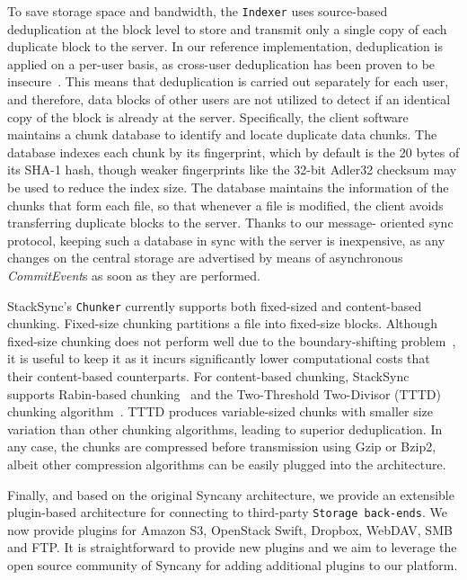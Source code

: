 To save storage space and bandwidth, the \texttt{Indexer} uses source-based deduplication at the block
level to store and transmit only a single copy of each duplicate block to the server. In our
reference implementation, deduplication is applied on a per-user basis, as cross-user
deduplication has been proven to be insecure~\cite{harnik10}. This means that deduplication is carried out
separately for each user, and therefore, data blocks of other users are not utilized to detect
if an identical copy of the block is already at the server. Specifically, the client software
maintains a chunk database to identify and locate duplicate data chunks. The database indexes
each chunk by its fingerprint, which by default is the 20 bytes of its SHA-1 hash, though weaker
fingerprints like the 32-bit Adler32 checksum may be used to reduce the index size. The database
maintains the information of the chunks that form each file, so that whenever a file is
modified, the client avoids transferring duplicate blocks to the server. Thanks to our message-
oriented sync protocol, keeping such a database in sync with the server is inexpensive, as any
changes on the central storage are advertised by means of asynchronous \textit{CommitEvent}s as soon as
they are performed.

StackSync's \texttt{Chunker} currently supports both fixed-sized and content-based chunking. Fixed-size chunking partitions a
file into fixed-size blocks. Although fixed-size chunking does not perform well due to the
boundary-shifting problem~\cite{Eshghi05}, it is useful to keep it as it incurs significantly lower
computational costs that their content-based counterparts. For content-based chunking, StackSync
supports Rabin-based chunking~\cite{Muthitacharoen01} and the Two-Threshold Two-Divisor (TTTD) chunking
algorithm~\cite{Eshghi05}. TTTD produces variable-sized chunks with smaller size variation than other
chunking algorithms, leading to superior deduplication. In any case, the chunks are compressed
before transmission using Gzip or Bzip2, albeit other compression algorithms can be easily
plugged into the architecture.

Finally, and based on the original Syncany architecture, we provide an extensible plugin-based architecture for connecting to third-party \texttt{Storage back-ends}. We now provide plugins for Amazon S3, OpenStack Swift, Dropbox, WebDAV, SMB and FTP.  It is straightforward to provide new plugins and we aim to leverage the open source community of Syncany for adding additional plugins to our platform.